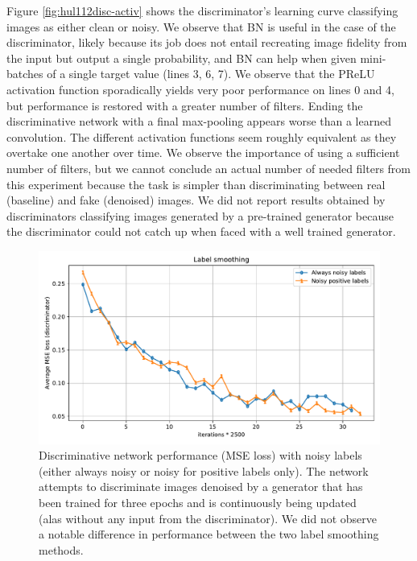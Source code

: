 Figure \ref{fig:hul112disc-activ} shows the discriminator's learning curve classifying images as either clean or noisy. We observe that \acl{BN} is useful in the case of the discriminator, likely because its job does not entail recreating image fidelity from the input but output a single probability, and \acl{BN} can help when given mini-batches of a single target value (lines 3, 6, 7). We observe that the \ac{PReLU} activation function sporadically yields very poor performance on lines 0 and 4, but performance is restored with a greater number of filters. Ending the discriminative network with a final max-pooling appears worse than a learned convolution. The different activation functions seem roughly equivalent as they overtake one another over time. We observe the importance of using a sufficient number of filters, but we cannot conclude an actual number of needed filters from this experiment because the task is simpler than discriminating between real (baseline) and fake (denoised) images. We did not report results obtained by discriminators classifying images generated by a pre-trained generator because the discriminator could not catch up when faced with a well trained generator.%

\begin{figure}[!htbp]
\centering
\includegraphics[width=1\linewidth]{gfx/graphs/label-smoothing.pdf}
\caption[Discriminative network performance with noisy labels (always noisy or noisy for positive labels only)]{Discriminative network performance (\ac{MSE} loss) with noisy labels (either always noisy or noisy for positive labels only). The network attempts to discriminate images denoised by a generator that has been trained for three epochs and is continuously being updated (alas without any input from the discriminator). We did not observe a notable difference in performance between the two label smoothing methods.}
\label{fig:label-smoothing}
\end{figure}

